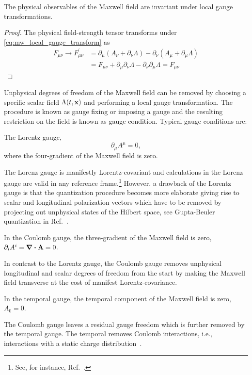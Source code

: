 \begin{theorem}\label{thm:mw_local_gauge_invariance}
	The physical observables of the Maxwell field are invariant under local gauge transformations.
\end{theorem}
\begin{proof}
	The physical field-strength tensor transforms under \cref{eq:mw_local_gauge_transform} as
	\begin{equation*}
		\begin{split}
			F_{\mu\nu}
			\to
			F_{\mu\nu}^\prime
			&=
			\partial_\mu\left(A_\nu+\partial_\nu\Lambda\right)
			-
			\partial_\nu\left(A_\mu+\partial_\mu\Lambda\right)
			\\
			&=
			F_{\mu\nu}
			+
			\partial_\mu\partial_\nu\Lambda
			-
			\partial_\nu\partial_\mu\Lambda
			=
			F_{\mu\nu}
		\end{split}
	\end{equation*}	
\end{proof}


Unphysical degrees of freedom of the Maxwell field can be removed by choosing a specific scalar field $\Lambda(t,\vb{x})$ and performing a local gauge transformation.
The procedure is known as gauge fixing or imposing a gauge and the resulting restriction on the field is known as gauge condition.
Typical gauge conditions are:
\begin{definition}
	The Lorentz gauge,
	\begin{equation}
		\partial_\mu
		A^\mu
		=
		0
		,
	\end{equation}
	where the four-gradient of the Maxwell field is zero.
\end{definition}
The Lorenz gauge is manifestly Lorentz-covariant and calculations in the Lorenz gauge are valid in any reference frame.\footnote{See, for instance, Ref.~\cite[p.~144]{Greiner2013}.}
However, a drawback of the Lorentz gauge is that the quantization procedure becomes more elaborate giving rise to scalar and longitudinal polarization vectors which have to be removed by projecting out unphysical states of the Hilbert space, see Gupta-Beuler quantization in Ref.~\cite[p.~180]{Greiner2013}.
\begin{definition}
	In the Coulomb gauge, the three-gradient of the Maxwell field is zero, $\partial_iA^i=\div\vb{A}=0$.
\end{definition}
In contrast to the Lorentz gauge, the Coulomb gauge removes unphysical longitudinal and scalar degrees of freedom from the start by making the Maxwell field transverse at the cost of manifest Lorentz-covariance.
\begin{definition}
	In the temporal gauge, the temporal component of the Maxwell field is zero, $A_0=0$.
\end{definition}
The Coulomb gauge leaves a residual gauge freedom which is further removed by the temporal gauge.
The temporal removes Coulomb interactions, i.e., interactions with a static charge distribution~\cite[p.~200]{Greiner2013}.

